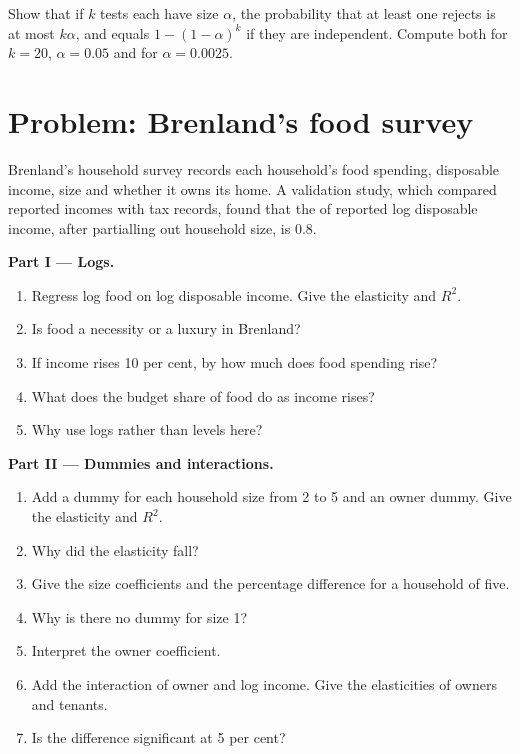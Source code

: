 \begin{exercise}[$\star\star\star$]\label{exo:b2:specification:12}
Show that if $k$ tests each have size $\alpha$, the probability that at least one rejects is at most $k\alpha$, and equals
$1 - (1 - \alpha)^k$ if they are independent. Compute both for $k = 20$, $\alpha = 0.05$ and for $\alpha = 0.0025$.
\end{exercise}

\section{Problem: Brenland's food survey}\label{sec:b2:specification:problem}

\begin{problem}
\label{pb:b2:specification:1}
Brenland's household survey records each household's food spending, disposable income, size and whether it owns its
home. A validation study, which compared reported incomes with tax records, found that the  of reported
log disposable income, after partialling out household size, is 0.8.

\medskip
\noindent\textbf{Part I --- Logs.}
\begin{enumerate}
  \item Regress log food on log disposable income. Give the elasticity and $R^2$.
  \item Is food a necessity or a luxury in Brenland?
  \item If income rises 10 per cent, by how much does food spending rise?
  \item What does the budget share of food do as income rises?
  \item Why use logs rather than levels here?
\end{enumerate}

\medskip
\noindent\textbf{Part II --- Dummies and interactions.}
\begin{enumerate}[resume]
  \item Add a dummy for each household size from 2 to 5 and an owner dummy. Give the elasticity and $R^2$.
  \item Why did the elasticity fall?
  \item Give the size coefficients and the percentage difference for a household of five.
  \item Why is there no dummy for size 1?
  \item Interpret the owner coefficient.
  \item Add the interaction of owner and log income. Give the elasticities of owners and tenants.
  \item Is the difference significant at 5 per cent?
\end{enumerate}


\end{problem}
